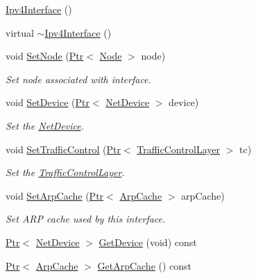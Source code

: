 \begin{DoxyCompactItemize}
\item 
\hyperlink{classns3_1_1Ipv4Interface_a244febab108e4a9328d4681b7f473f55}{Ipv4\+Interface} ()
\item 
virtual \hyperlink{classns3_1_1Ipv4Interface_a523fd4f0b7ad83fc16deae1de6fd722d}{$\sim$\+Ipv4\+Interface} ()
\item 
void \hyperlink{classns3_1_1Ipv4Interface_a3c380358fad7d480b72a162da5afa92f}{Set\+Node} (\hyperlink{classns3_1_1Ptr}{Ptr}$<$ \hyperlink{classns3_1_1Node}{Node} $>$ node)
\begin{DoxyCompactList}\small\item\em Set node associated with interface. \end{DoxyCompactList}\item 
void \hyperlink{classns3_1_1Ipv4Interface_a7b660cfd9572c0c0d5bf96dd00092026}{Set\+Device} (\hyperlink{classns3_1_1Ptr}{Ptr}$<$ \hyperlink{classns3_1_1NetDevice}{Net\+Device} $>$ device)
\begin{DoxyCompactList}\small\item\em Set the \hyperlink{classns3_1_1NetDevice}{Net\+Device}. \end{DoxyCompactList}\item 
void \hyperlink{classns3_1_1Ipv4Interface_a481a37efb6f89c5e39ea0102a91f934a}{Set\+Traffic\+Control} (\hyperlink{classns3_1_1Ptr}{Ptr}$<$ \hyperlink{classns3_1_1TrafficControlLayer}{Traffic\+Control\+Layer} $>$ tc)
\begin{DoxyCompactList}\small\item\em Set the \hyperlink{classns3_1_1TrafficControlLayer}{Traffic\+Control\+Layer}. \end{DoxyCompactList}\item 
void \hyperlink{classns3_1_1Ipv4Interface_a19cd2d29d0f6a9a91fe7d3386665e159}{Set\+Arp\+Cache} (\hyperlink{classns3_1_1Ptr}{Ptr}$<$ \hyperlink{classns3_1_1ArpCache}{Arp\+Cache} $>$ arp\+Cache)
\begin{DoxyCompactList}\small\item\em Set A\+RP cache used by this interface. \end{DoxyCompactList}\item 
\hyperlink{classns3_1_1Ptr}{Ptr}$<$ \hyperlink{classns3_1_1NetDevice}{Net\+Device} $>$ \hyperlink{classns3_1_1Ipv4Interface_a49d5b20e57304124cc852bae846db44b}{Get\+Device} (void) const 
\item 
\hyperlink{classns3_1_1Ptr}{Ptr}$<$ \hyperlink{classns3_1_1ArpCache}{Arp\+Cache} $>$ \hyperlink{classns3_1_1Ipv4Interface_ab9f56e353b93795c8918cd7aafcf92d9}{Get\+Arp\+Cache} () const 

\end{DoxyCompactItemize}
